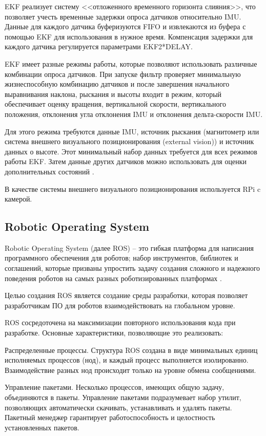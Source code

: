 EKF реализует систему <<отложенного временного горизонта слияния>>, что позволяет учесть временные задержки опроса датчиков относительно IMU. Данные для каждого датчика буферизуются FIFO и извлекаются из буфера с помощью EKF для использования в нужное время. Компенсация задержки для каждого датчика регулируется параметрами EKF2*DELAY.

EKF имеет разные режимы работы, которые позволяют использовать различные комбинации опроса датчиков. При запуске фильтр проверяет минимальную жизнеспособную комбинацию датчиков и после завершения начального выравнивания наклона, рыскания и высоты входит в режим, который обеспечивает оценку вращения, вертикальной скорости, вертикального положения, отклонения угла отклонения IMU и отклонения дельта-скорости IMU.

Для этого режима требуются данные IMU, источник рыскания (магнитометр или система внешнего визуального позиционирования (external vision)) и источник данных о высоте. Этот минимальный набор данных требуется для всех режимов работы EKF. Затем данные других датчиков можно использовать для оценки дополнительных состояний \cite{px4}.

В качестве системы внешнего визуального позиционирования используется RPi c камерой.

\subsection{Robotic Operating System}

Robotic Operating System (далее ROS) -- это гибкая платформа для написания программного обеспечения для роботов; набор инструментов, библиотек и соглашений, которые призваны упростить задачу создания сложного и надежного поведения роботов на самых разных роботизированных платформах \cite{ros}.

Целью создания ROS является создание среды разработки, которая позволяет разработчикам ПО для роботов взаимодействовать на глобальном уровне.

ROS сосредоточена на максимизации повторного использования кода при разработке. Основные характеристики, позволяющие это реализовать:

Распределенные процессы. Структура ROS создана в виде минимальных единиц исполняемых процессов (нод), и каждый процесс выполняется изолированно. Взаимодействие разных нод происходит только на уровне обмена сообщениями.

Управление пакетами. Несколько процессов, имеющих общую задачу, объединяются в пакеты. Управление пакетами подразумевает набор утилит, позволяющих автоматически скачивать, устанавливать и удалять пакеты. Пакетный менеджер гарантирует работоспособность и целостность установленных пакетов.

